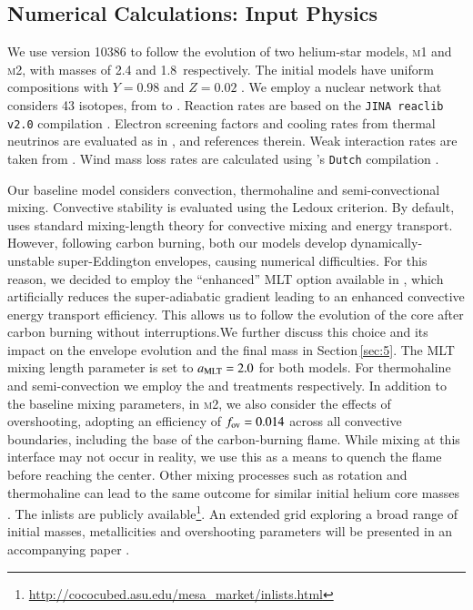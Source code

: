 \documentclass{aa}
\begin{document}
\subsection{Numerical Calculations: Input Physics}\label{sec:2.1}
We use \mesa version 10386 to follow the evolution of two helium-star models, \textsc{m1} and \textsc{m2}, with  masses of  2.4 and 1.8\msun\ respectively. 
The initial models have uniform compositions with $Y=0.98$ and $Z=0.02$ \citep[solar abundances are taken from ][]{grevesse1998}. We employ a nuclear network that considers 43  isotopes, from  to . Reaction rates are based on the \texttt{JINA reaclib v2.0} compilation \citep{cyburt2010}. Electron screening factors and cooling rates from thermal neutrinos are evaluated as in \cite{Farmer:2015afs}, and references therein. 
Weak interaction rates are taken from \cite{Suzuki:2015iry}. 
Wind mass loss rates are calculated using \mesa's \texttt{Dutch} compilation   \citep{Paxton:2013pj}. 

Our baseline  model considers convection, thermohaline and semi-convectional mixing. Convective stability is 
evaluated using the Ledoux criterion. By default, \mesa uses  standard mixing-length theory  \citep[MTL;][]{cox1968} for convective mixing and energy transport. However, following carbon burning, both our models develop 
dynamically-unstable super-Eddington envelopes, causing numerical 
difficulties. For this reason, we decided to employ the ``enhanced'' MLT 
option available in \mesa \citep{Paxton:2013pj}, which artificially reduces 
the super-adiabatic gradient leading to  an enhanced convective energy 
transport efficiency.  This  allows us to follow the evolution of the core 
after carbon burning without interruptions.We further discuss this choice and its impact on the envelope evolution and the final mass in Section\,\ref{sec:5}. 
The MLT mixing length parameter is set to $a_{\rm MLT}=2.0$ for both models. For thermohaline and semi-convection we employ the \cite{kippenhahn1980} and \cite{langer1983} treatments respectively. 
In addition to the baseline mixing parameters, in \textsc{m2}, we also 
consider the effects of overshooting, adopting an efficiency of $f_{\rm ov}=0.014$ across all convective boundaries, including the base of the 
carbon-burning flame. While mixing at this interface may not occur in reality, 
we use this as a means to  quench the flame before reaching the center.  
Other mixing processes such as rotation and thermohaline can lead to the 
same outcome for similar initial helium core masses \citep{Farmer:2015afs}.
The \mesa inlists are publicly available\footnote{\url{http://cococubed.asu.edu/mesa_market/inlists.html}}. 
An  extended grid exploring a broad range of initial masses, 
metallicities and overshooting parameters will be presented in an 
accompanying paper \citep{chanlaridis2019}.       
\end{document}
